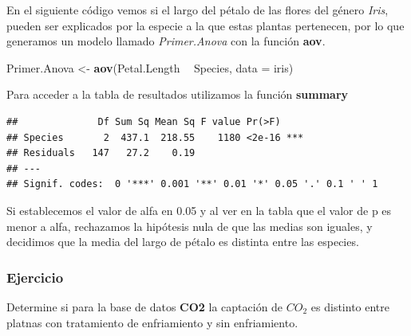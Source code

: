 \documentclass[]{article}
\newenvironment{Shaded}{\begin{snugshade}}{\end{snugshade}}
\newcommand{\KeywordTok}[1]{\textcolor[rgb]{0.13,0.29,0.53}{\textbf{#1}}}
\newcommand{\DataTypeTok}[1]{\textcolor[rgb]{0.13,0.29,0.53}{#1}}
\newcommand{\StringTok}[1]{\textcolor[rgb]{0.31,0.60,0.02}{#1}}
\newcommand{\OperatorTok}[1]{\textcolor[rgb]{0.81,0.36,0.00}{\textbf{#1}}}
\newcommand{\NormalTok}[1]{#1}
\begin{document}
En el siguiente código vemos si el largo del pétalo de las flores del
género \emph{Iris}, pueden ser explicados por la especie a la que estas
plantas pertenecen, por lo que generamos un modelo llamado
\emph{Primer.Anova} con la función \textbf{aov}.

\begin{Shaded}
\begin{Highlighting}[]
\NormalTok{Primer.Anova <-}\StringTok{ }\KeywordTok{aov}\NormalTok{(Petal.Length }\OperatorTok{~}\StringTok{ }\NormalTok{Species, }\DataTypeTok{data =}\NormalTok{ iris)}
\end{Highlighting}
\end{Shaded}

Para acceder a la tabla de resultados utilizamos la función
\textbf{summary}

\begin{verbatim}
##              Df Sum Sq Mean Sq F value Pr(>F)    
## Species       2  437.1  218.55    1180 <2e-16 ***
## Residuals   147   27.2    0.19                   
## ---
## Signif. codes:  0 '***' 0.001 '**' 0.01 '*' 0.05 '.' 0.1 ' ' 1
\end{verbatim}

Si establecemos el valor de alfa en 0.05 y al ver en la tabla que el
valor de p es menor a alfa, rechazamos la hipótesis nula de que las
medias son iguales, y decidimos que la media del largo de pétalo es
distinta entre las especies.

\subsubsection{Ejercicio}\label{ejercicio}

Determine si para la base de datos \textbf{CO2} la captación de \(CO_2\)
es distinto entre platnas con tratamiento de enfriamiento y sin
enfriamiento.
\end{document}
